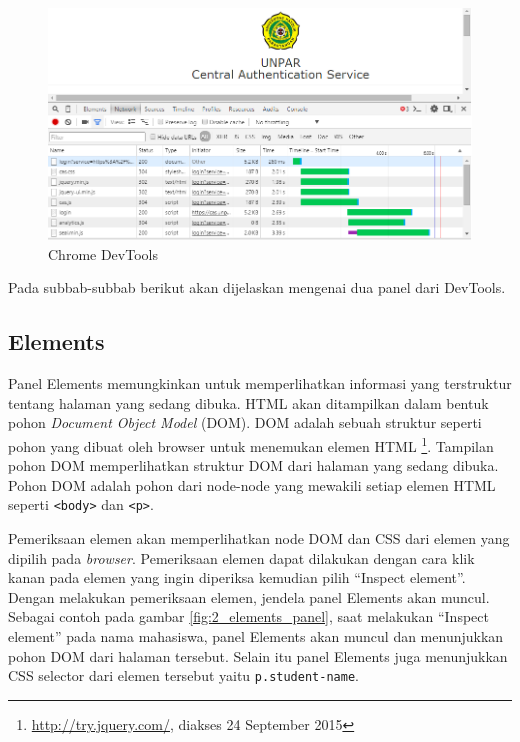 \begin{figure}[H]
	\centering
	\includegraphics[scale=0.5]{Gambar/chrome-devtools}
	\caption{Chrome DevTools} 
	\label{fig:2_chrome_devtools}
\end{figure}

Pada subbab-subbab berikut akan dijelaskan mengenai dua panel dari DevTools.

\subsection{Elements}
Panel Elements memungkinkan untuk memperlihatkan informasi yang terstruktur tentang halaman yang sedang dibuka. HTML akan ditampilkan dalam bentuk pohon \textit{Document Object Model} (DOM). DOM adalah sebuah struktur seperti pohon yang dibuat oleh browser untuk menemukan elemen HTML \footnote{\url{http://try.jquery.com/}, diakses 24 September 2015}. Tampilan pohon DOM memperlihatkan struktur DOM dari halaman yang sedang dibuka. Pohon DOM adalah pohon dari node-node yang mewakili setiap elemen HTML seperti \texttt{<body>} dan \texttt{<p>}. 

Pemeriksaan elemen akan memperlihatkan node DOM dan CSS dari elemen yang dipilih pada \textit{browser}. Pemeriksaan elemen dapat dilakukan dengan cara klik kanan pada elemen yang ingin diperiksa kemudian pilih ``Inspect element''. Dengan melakukan pemeriksaan elemen, jendela panel Elements akan muncul. Sebagai contoh pada gambar \ref{fig:2_elements_panel}, saat melakukan ``Inspect element'' pada nama mahasiswa, panel Elements akan muncul dan menunjukkan pohon DOM dari halaman tersebut. Selain itu panel Elements juga menunjukkan CSS selector dari elemen tersebut yaitu \texttt{p.student-name}.

